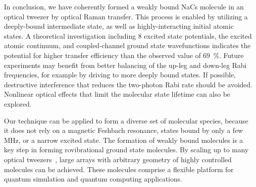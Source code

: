 \documentclass[aps,prl,twocolumn,10pt,superscriptaddress]{revtex4-1}
\newcommand{\todo}[1]{}
\begin{document}

In conclusion, we have coherently formed a weakly bound NaCs molecule in an optical tweezer
by optical Raman transfer.  This process is enabled by utilizing a deeply-bound intermediate state, as well as highly-interacting initial atomic states.  A theoretical investigation including 8 excited state potentials,
the excited atomic continuum, and coupled-channel ground state wavefunctions indicates
the potential for higher transfer efficiency than the observed value of $69$~\%.  Future experiments may benefit from better balancing of the up-leg and down-leg Rabi frequencies, for example by driving to more deeply bound states.  If possible, destructive interference that reduces the two-photon Rabi rate should be avoided.  Nonlinear optical effects that limit the molecular state lifetime can also be explored.

Our technique can be applied to form a diverse set of molecular species,
because it does not rely on a magnetic Feshbach resonance, states bound by only a few MHz,
or a narrow excited state. The formation of weakly bound molecules is a key step
in forming rovibrational ground state molecules. By scaling up to many optical tweezers~\cite{Endres2016, Barredo2018,  PhysRevLett.122.203601}, large arrays with arbitrary geometry of highly controlled molecules can be achieved. These molecules comprise a flexible platform for quantum simulation and quantum computing applications. %

\todo{sm: STIRAP vs Raman}
\end{document}
